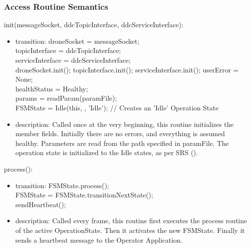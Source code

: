 \documentclass[12pt, titlepage]{article}
\begin{document}
\subsubsection{Access Routine Semantics}
\noindent init(messageSocket, ddcTopicInterface, ddcServiceInterface):
\begin{itemize}
\item transition: droneSocket = messageSocket; \\ 
topicInterface = ddcTopicInterface; \\
serviceInterface = ddcServiceInterface; \\
droneSocket.init();
topicInterface.init();
serviceInterface.init();
userError = None; \\
healthStatus = Healthy; \\ 
params = readParam(paramFile); \\ 
FSMState = Idle(this, {}, 'Idle'); // Creates an 'Idle' Operation State\\

\item description: Called once at the very beginning, this routine initializes the member fields. Initially there are no errors, and everything is assumed healthy. Parameters are read from the path specified in paramFile. The operation state is initialized to the Idle states, as per SRS ().
\end{itemize}
\noindent process():
\begin{itemize}
\item transition: FSMState.process(); \\
FSMState = FSMState.transitionNextState(); \\
sendHeartbeat();
\item description: Called every frame, this routine first executes the process routine of the active OperationState. Then it activates the new FSMState. Finally it sends a heartbeat message to the Operator Application.
\end{itemize}
\end{document}

